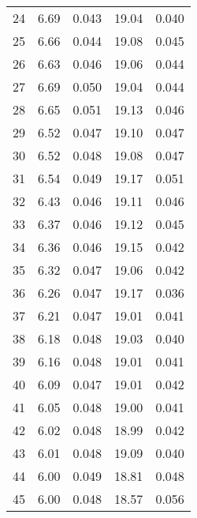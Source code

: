 \begin{table}
\begin{tabular}{c|ll|ll}
24 & 6.69 & 0.043 & 19.04 & 0.040 \\
25 & 6.66 & 0.044 & 19.08 & 0.045 \\
26 & 6.63 & 0.046 & 19.06 & 0.044 \\
27 & 6.69 & 0.050 & 19.04 & 0.044 \\
28 & 6.65 & 0.051 & 19.13 & 0.046 \\
29 & 6.52 & 0.047 & 19.10 & 0.047 \\
30 & 6.52 & 0.048 & 19.08 & 0.047 \\
31 & 6.54 & 0.049 & 19.17 & 0.051 \\
32 & 6.43 & 0.046 & 19.11 & 0.046 \\
33 & 6.37 & 0.046 & 19.12 & 0.045 \\
34 & 6.36 & 0.046 & 19.15 & 0.042 \\
35 & 6.32 & 0.047 & 19.06 & 0.042 \\
36 & 6.26 & 0.047 & 19.17 & 0.036 \\
37 & 6.21 & 0.047 & 19.01 & 0.041 \\
38 & 6.18 & 0.048 & 19.03 & 0.040 \\
39 & 6.16 & 0.048 & 19.01 & 0.041 \\
40 & 6.09 & 0.047 & 19.01 & 0.042 \\
41 & 6.05 & 0.048 & 19.00 & 0.041 \\
42 & 6.02 & 0.048 & 18.99 & 0.042 \\
43 & 6.01 & 0.048 & 19.09 & 0.040 \\
44 & 6.00 & 0.049 & 18.81 & 0.048 \\
45 & 6.00 & 0.048 & 18.57 & 0.056 \\
               \hline
        \end{tabular}
    \end{table}
    \clearpage

